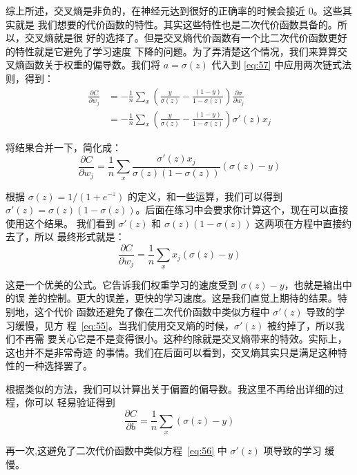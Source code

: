 综上所述，交叉熵是非负的，在神经元达到很好的正确率的时候会接近 $0$。这些其实就是
我们想要的代价函数的特性。其实这些特性也是二次代价函数具备的。所以，交叉熵就是很
好的选择了。但是交叉熵代价函数有一个比二次代价函数更好的特性就是它避免了学习速度
下降的问题。为了弄清楚这个情况，我们来算算交叉熵函数关于权重的偏导数。我们将
$a=\sigma(z)$ 代入到 \eqref{eq:57} 中应用两次链式法则，得到：
\begin{align}
  \frac{\partial C}{\partial w_j} &= -\frac{1}{n} \sum_x \left(
  \frac{y }{\sigma(z)} -\frac{(1-y)}{1-\sigma(z)} \right)
  \frac{\partial \sigma}{\partial w_j} \label{eq:58}\tag{58}\\
  &= -\frac{1}{n} \sum_x \left(
  \frac{y}{\sigma(z)}
  -\frac{(1-y)}{1-\sigma(z)} \right)\sigma'(z) x_j \label{eq:59}\tag{59}
\end{align}

将结果合并一下，简化成：
\begin{equation}
  \frac{\partial C}{\partial w_j} = \frac{1}{n} \sum_x \frac{\sigma'(z)
    x_j}{\sigma(z) (1-\sigma(z))} (\sigma(z)-y)
\label{eq:60}\tag{60}
\end{equation}

根据 $\sigma(z) = 1/(1+e^{-z})$ 的定义，和一些运算，我们可以得到 $\sigma'(z) =
\sigma(z)(1-\sigma(z))$。后面在练习中会要求你计算这个，现在可以直接使用这个结果。
我们看到 $\sigma'(z)$ 和 $\sigma(z)(1-\sigma(z))$ 这两项在方程中直接约去了，所以
最终形式就是：
\begin{equation}
  \frac{\partial C}{\partial w_j} =  \frac{1}{n} \sum_x x_j(\sigma(z)-y)
\label{eq:61}\tag{61}
\end{equation}

这是一个优美的公式。它告诉我们权重学习的速度受到 $\sigma(z)-y$，也就是输出中的误
差的控制。更大的误差，更快的学习速度。这是我们直觉上期待的结果。特别地，这个代价
函数还避免了像在二次代价函数中类似方程中 $\sigma'(z)$ 导致的学习缓慢，见方
程~\eqref{eq:55}。当我们使用交叉熵的时候，$\sigma'(z)$ 被约掉了，所以我们不再需
要关心它是不是变得很小。这种约除就是交叉熵带来的特效。实际上，这也并不是非常奇迹
的事情。我们在后面可以看到，交叉熵其实只是满足这种特性的一种选择罢了。

根据类似的方法，我们可以计算出关于偏置的偏导数。我这里不再给出详细的过程，你可以
轻易验证得到
\begin{equation}
  \frac{\partial C}{\partial b} = \frac{1}{n} \sum_x (\sigma(z)-y)
\label{eq:62}\tag{62}
\end{equation}

再一次,这避免了二次代价函数中类似方程~\eqref{eq:56} 中 $\sigma'(z)$ 项导致的学习
缓慢。


